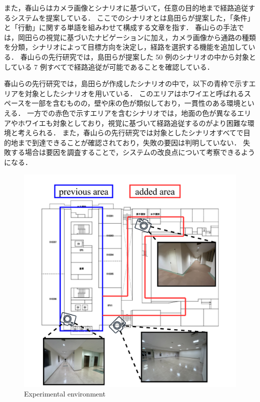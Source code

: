 また，春山ら\cite{haruyama2023}はカメラ画像とシナリオに基づいて，任意の目的地まで経路追従するシステムを提案している．
ここでのシナリオとは島田ら\cite{shimada2020}が提案した，「条件」と「行動」に関する単語を組みわせて構成する文章を指す．
春山らの手法では，岡田らの視覚に基づいたナビゲーションに加え，カメラ画像から通路の種類を分類，シナリオによって目標方向を決定し，経路を選択する機能を追加している．
春山らの先行研究では，島田らが提案した 50 例のシナリオの中から対象としている 7 例すべてで経路追従が可能であることを確認している．

春山らの先行研究では，島田らが作成したシナリオの中で，以下の青枠で示すエリアを対象としたシナリオを用いている．
このエリアはホワイエと呼ばれるスペースを一部を含むものの，壁や床の色が類似しており，一貫性のある環境といえる．
一方での赤色で示すエリアを含むシナリオでは，地面の色が異なるエリアやホワイエも対象としており，視覚に基づいて経路追従するのがより困難な環境と考えられる．
また，春山らの先行研究では対象としたシナリオすべてで目的地まで到達できることが確認されており，失敗の要因は判明していない．
失敗する場合は要因を調査することで，システムの改良点について考察できるようになる．

\begin{figure}[htbp]
     \centering
     \includegraphics[width=130mm]{images/pdf/ishiguro/cit3f.pdf}
     \caption{Experimental environment}
     \label{fig:cit3f}
\end{figure}

\newpage
